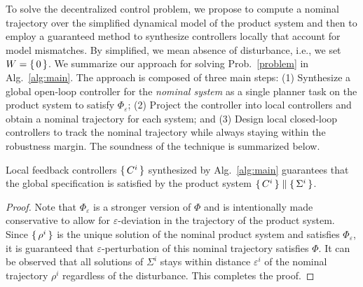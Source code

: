 

To solve the decentralized control problem, 
we propose to compute a nominal trajectory over the simplified dynamical model of the product system and then to
employ a guaranteed method to synthesize controllers locally that account for model mismatches. 
By simplified, we mean absence of disturbance, i.e., we set $W=\set{0}$.
We summarize our approach for solving Prob.~\ref{problem} in Alg.~\ref{alg:main}.
The approach is composed of three main steps:
(1) Synthesize a global open-loop controller for the \emph{nominal system} as a single planner task on the product system to satisfy $\Phi_\varepsilon$;
(2) Project the controller into local controllers and obtain a nominal trajectory for each system; and
(3) Design local closed-loop controllers to track the nominal trajectory while always staying within the robustness margin.
The soundness of the technique is summarized below.

\begin{theorem}
Local feedback controllers $\set{C^i}$ synthesized by Alg.~\ref{alg:main} guarantees that the global specification is satisfied by the product system $\set{C^i}\parallel \set{\Sigma^i}$. 
\end{theorem}
\begin{proof}
Note that $\Phi_\varepsilon$ is a stronger version of $\Phi$ and is intentionally made conservative to allow for $\varepsilon$-deviation in the trajectory of the product system.
Since $\set{\rho^i}$ is the unique solution of the nominal product system and satisfies $\Phi_\varepsilon$, it is guaranteed that $\varepsilon$-perturbation of this nominal trajectory satisfies $\Phi$.
It can be observed that all solutions of $\Sigma^i$ stays within distance $\varepsilon^i$ of the nominal trajectory 
$\rho^i$ regardless of the disturbance. 
This completes the proof.
\end{proof}


